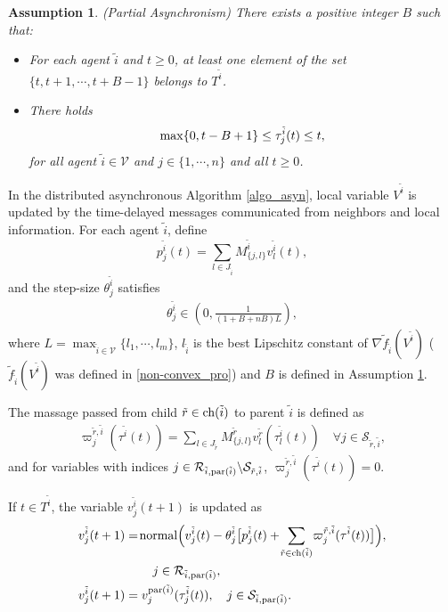 \documentclass[journal]{IEEEtran}
\newtheorem{assumption}{Assumption}[section]
\begin{document}
{\begin{assumption}\label{total_asyn}
		(Partial Asynchronism) There exists a positive integer $B$ such that:
		\begin{itemize}
			\item For each agent $\tilde{i}$ and $t\geq 0$, at least one element of the set $\{t,t+1,\cdots,t+B-1\}$ belongs to $T^{\tilde{i}}$.
			\item There holds $${\rm max}\{0,t-B+1\}\leq \tau_{{j}}^{\tilde{i}}(t)\leq t,$$
			for all agent $\tilde{i}\in \mathcal{V}$ and ${j}\in \{1,\cdots,n\}$ and all $t\geq 0$.
		\end{itemize}
\end{assumption}}

\par In the distributed asynchronous Algorithm \ref{algo_asyn}, local variable $V^{\tilde{i}}$ is updated by the time-delayed messages communicated from neighbors and local information. For each agent $\tilde{i}$, define $$p_j^{\tilde{i}}(t)= \sum_{l\in J_{\tilde{i}}} M_{\{j,l\}}^{\tilde{i}} {v}_l^{\tilde{i}}(t),$$ and the step-size $\theta_j^{\tilde{i}}$ satisfies
\begin{align}\label{asyn_step}
\theta_j^{\tilde{i}}\in (0,\frac{1}{(1+B+nB)L}),
\end{align}
where $L= \max_{\tilde{i}\in \mathcal{V}}\{l_1,\cdots,l_m\}$, $l_{\tilde{i}}$ is the best Lipschitz constant of $\nabla \tilde{f}_{\tilde{i}}(V^{\tilde{i}})$ ($\tilde{f}_{\tilde{i}}(V^{\tilde{i}})$ was defined in \eqref{non-convex_pro}) and $B$ is defined in Assumption \ref{total_asyn}.
\par The massage passed from child $\tilde{r}\in {\rm ch}(\tilde{i})$ to parent  $\tilde{i}$ is defined as
\begin{align*}
\varpi_j^{\tilde{r},\tilde{i}}(\tau^{\tilde{i}}(t)) = \sum_{l\in J_{\tilde{r}}} M_{\{j,l\}}^{\tilde{r}} v_l^{\tilde{r}}(\tau_l^{\tilde{i}}(t)) \quad \forall j \in \mathcal{S}_{\tilde{r},\tilde{i}},
\end{align*}
and for variables with indices $j\in \mathcal{R}_{\tilde{i},{\rm par}(\tilde{i})}\backslash \mathcal{S}_{\tilde{r},\tilde{i}}$,
$\varpi_j^{\tilde{r},\tilde{i}}(\tau^{\tilde{i}}(t))=0$.
\par If $t\in T^{\tilde{i}}$, the variable $v_j^{\tilde{i}}(t+1)$ is updated as
\begin{subequations}\label{v_updateasm}
\begin{align}
&v_j^{\tilde{i}}(t+1)=\!{\rm normal}\Big(v_j^{\tilde{i}}(t)-\theta_j^{\tilde{i}} \big[p_j^{\tilde{i}}(t)+\!\sum_{\tilde{r}\in {\rm ch}(\tilde{i})}\!\varpi_j^{\tilde{r},\tilde{i}}(\tau^{\tilde{i}}(t))\big]\Big),\notag\\ 
& \qquad \qquad \qquad  j\in \mathcal{R}_{\tilde{i},{\rm par}(\tilde{i})}\label{asyn_r},\\
& v_j^{\tilde{i}}(t+1)=v_j^{{\rm par}(\tilde{i})}(\tau_{j}^{\tilde{i}}(t)),\quad j\in \mathcal{S}_{\tilde{i},{\rm par}(\tilde{i})}\label{asyn_s}.
\end{align}
\end{subequations}
\end{document}
